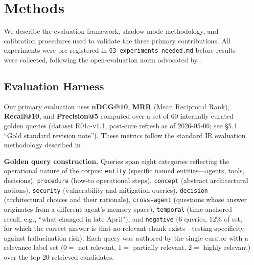 
\section{Methods}

We describe the evaluation framework, shadow-mode methodology, and calibration procedures
used to validate the three primary contributions. All experiments were pre-registered in
\texttt{03-experiments-needed.md} before results were collected, following the
open-evaluation norm advocated by \cite{rogers2021just}.

\subsection{Evaluation Harness}

Our primary evaluation uses \textbf{nDCG@10}, \textbf{MRR} (Mean Reciprocal Rank),
\textbf{Recall@10}, and \textbf{Precision@5} computed over a set of 60 internally curated
golden queries (dataset R01c-v1.1, post-cure refresh as of 2026-05-06; see \S5.1 ``Gold standard revision note''). These metrics follow the
standard IR evaluation methodology described in \cite{manning2008introduction}.

\textbf{Golden query construction.} Queries span eight categories reflecting the
operational nature of the corpus: \texttt{entity} (specific named entities---agents, tools,
decisions), \texttt{procedure} (how-to operational steps), \texttt{concept} (abstract
architectural notions), \texttt{security} (vulnerability and mitigation queries),
\texttt{decision} (architectural choices and their rationale), \texttt{cross-agent}
(questions whose answer originates from a different agent's memory space),
\texttt{temporal} (time-anchored recall, e.g., ``what changed in late April''), and
\texttt{negative} (6 queries, 12\% of set, for which the correct answer is that no
relevant chunk exists---testing specificity against hallucination risk). Each query was
authored by the single curator with a relevance label set ($0 =$ not relevant,
$1 =$ partially relevant, $2 =$ highly relevant) over the top-20 retrieved candidates.

